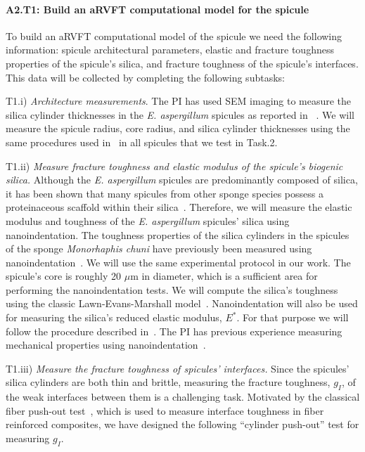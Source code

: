 \documentclass[10pt,letterpaper]{article}
\begin{document}
    \paragraph{A2.T1:  Build an aRVFT computational model for the spicule}
      To build an aRVFT computational model of the spicule we need the following information: spicule architectural parameters,
      elastic and fracture toughness properties of the spicule's silica,
      and fracture toughness of the spicule's interfaces.
      This data will be collected by completing the following subtasks:

      {\selectfont T1.i}) \textit{Architecture measurements}.
        The PI has used SEM imaging to measure the silica cylinder thicknesses in the \textit{E. aspergillum} spicules as reported in ~\cite{monn2015new}.
        We will measure the spicule radius, core radius, and silica cylinder thicknesses using the same procedures used in~\cite{monn2015new} in all spicules that we test in Task.2.

      {\selectfont T1.ii}) \textit{Measure fracture toughness and elastic modulus of the spicule's biogenic silica.}
        Although the \textit{E. aspergillum} spicules are predominantly composed of silica, it has been shown that many spicules from other sponge species  possess a proteinaceous scaffold within their silica~\cite{wang2010morphology, weaver2003nanostructural}.
        Therefore, we will measure the elastic modulus and toughness of the \textit{E. aspergillum} spicules' silica using nanoindentation. The toughness properties of the silica cylinders in the spicules of the sponge \textit{Monorhaphis chuni} have previously been measured using nanoindentation~\cite{woesz2006micromechanical, Miserez:2008wf}. We will use the same experimental protocol in our work.
        The spicule's core is roughly 20 $\mu$m in diameter, which is a sufficient area for performing the nanoindentation tests. We will compute the silica's toughness using the classic Lawn-Evans-Marshall model~\cite{lawn1975indentation, evans1976fracture}. Nanoindentation will also be used for measuring the silica's reduced elastic modulus, $E^*$. For that purpose we will follow the procedure described in~\cite{oliver1992improved}. The PI has previous experience measuring mechanical properties using nanoindentation~\cite{kesari2010role, kesari2011mechanics}.

      {\selectfont T1.iii}) \textit{Measure the fracture toughness of spicules' interfaces.}
        Since the spicules' silica cylinders are both thin and brittle, measuring the fracture toughness, $g_{I}$, of the weak interfaces between them is a challenging task. Motivated by the classical fiber push-out test~\cite{marshall1984indentation}, which is used to measure interface toughness in fiber reinforced composites, we have designed the following ``cylinder push-out'' test for measuring $g_{I}$.
\end{document}
